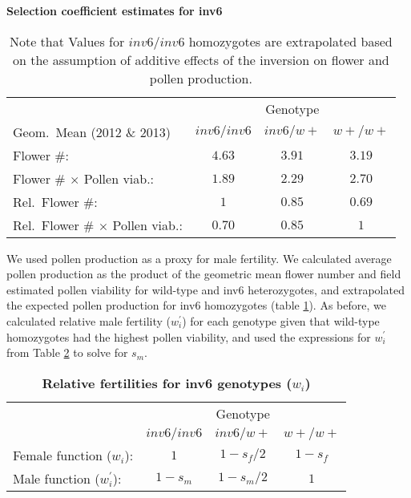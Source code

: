 \documentclass[11pt]{article}
\begin{document}
\begin{table}[htbp]
 \centering
 \caption{\bf Selection coefficient estimates for inv6}
\label{tab:MimReproEst}
\begin{tabular}{lccc}
 \toprule
 	&  \multicolumn{3}{c}{{Genotype}} \\ 
\cline{2-4}
Geom.~Mean (2012 \& 2013)			& $inv6/inv6$	& $inv6/w+$		& $w+/w+$ \\ \hline
Flower \#:								& $4.63$	& $3.91$	& $3.19$ \\	
Flower \# $\times$ Pollen viab.:		& $1.89$	& $2.29$	& $2.70$ \\ \hline
Rel.~Flower \#:							& $1$		& $0.85$	& $0.69$ \\	
Rel.~Flower \# $\times$ Pollen viab.:	& $0.70$	& $0.85$	& $1$ \\	
\hline
\end{tabular}
\caption{\footnotesize{Note that Values for $inv6/inv6$ homozygotes are extrapolated based on the assumption of additive effects of the inversion on flower and pollen production.}}
\end{table}

We used pollen production as a proxy for male fertility. We calculated average pollen production as the product of the geometric mean flower number and field estimated pollen viability for wild-type and inv6 heterozygotes, and extrapolated the expected pollen production for inv6 homozygotes (table \ref{tab:MimReproEst}). As before, we calculated relative male fertility ($w^{\prime}_i$) for each genotype given that wild-type homozygotes had the highest pollen viability, and used the expressions for $w^{\prime}_{i}$ from Table \ref{tab:inv6Fitness} to solve for $s_m$.

\begin{table}[htbp]
 \centering
 \caption{\bf Relative fertilities for inv6 genotypes ($w_{i}$)}
\label{tab:inv6Fitness}
\begin{tabular}{lccc}
 \toprule
					&  \multicolumn{3}{c}{{Genotype}} \\ 
\cline{2-4}
									& $inv6/inv6$	& $inv6/w+$		& $w+/w+$ 	\\ \hline
Female function ($w_{i}$):			& $1$			& $1 - s_f/2$	& $1 - s_f$ \\	
Male function ($w^{\prime}_{i}$):	& $1 - s_m$		& $1 - s_m/2$	& $1$ 		\\	
\hline
\end{tabular}
\end{table}
\end{document}
